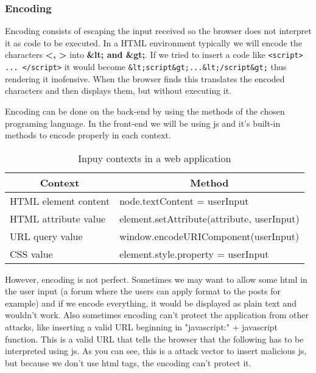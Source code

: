 \subsubsection{Encoding}
Encoding consists of escaping the input received so the browser does not interpret it as code to be executed. In a HTML environment typically we will encode the characters \textbf{<, >} into \textbf{\&lt; and \&gt;}. If we tried to insert a code like \verb|<script> ... </script>| it would become \verb|&lt;script&gt;...&lt;/script&gt;| thus rendering it inofensive. When the browser finds this translates the encoded characters and then displays them, but without executing it.

Encoding can be done on the back-end by using the methods of the chosen programing language. In the front-end we will be using js and it's built-in methods to encode properly in each context.

\begin{table}[]
	\centering
	\caption{Inpuy contexts in a web application}
	\label{my-label}
	\begin{tabular}{|l|l|}
		\hline
		\multicolumn{1}{|c|}{\textbf{Context}} & \multicolumn{1}{c|}{\textbf{Method}}                           \\ \hline
		HTML element content                   & node.textContent = userInput 									\\ \hline
		HTML attribute value                   & element.setAttribute(attribute, userInput)                   	\\ \hline
		URL query value                        & window.encodeURIComponent(userInput)                           \\ \hline
		CSS value                              & element.style.property = userInput                             \\ \hline
	\end{tabular}
\end{table}

However, encoding is not perfect. Sometimes we may want to allow some html in the user input (a forum where the users can apply format to the posts for example) and if we encode everything, it would be displayed as plain text and wouldn't work. Also sometimes encoding can't protect the application from other attacks, like inserting a valid URL beginning in "javascript:" + javascript function. This is a valid URL that tells the browser that the following has to be interpreted using js. As you can see, this is a attack vector to insert malicious js, but because we don't use html tags, the encoding can't protect it.

